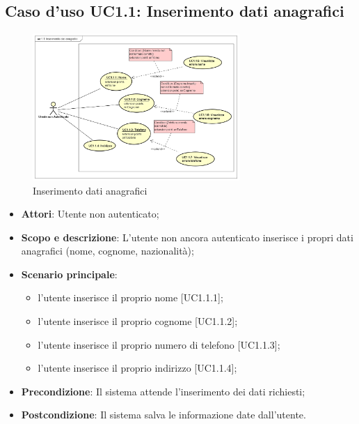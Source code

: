 \documentclass[12pt,a4paper,titlepage]{article}
\begin{document}
	\subsection{Caso d'uso UC1.1: Inserimento dati anagrafici}
	\label{UC1.1}
	\begin{figure}[ht]
		\centering
		\includegraphics[width=0.7\textwidth]{UseCase/InserimentoDatiAnagrafici}
		\caption{Inserimento dati anagrafici}
	\end{figure}
	\begin{itemize}
		\item \textbf{Attori}: Utente non autenticato;
		\item \textbf{Scopo e descrizione}: L'utente non ancora autenticato inserisce i propri dati anagrafici (nome, cognome, nazionalità);
		\item \textbf{Scenario principale}: 
		\begin{itemize}
			\item l'utente inserisce il proprio nome [UC1.1.1];
			\item l'utente inserisce il proprio cognome [UC1.1.2];
			\item l'utente inserisce il proprio numero di telefono [UC1.1.3];
			\item l'utente inserisce il proprio indirizzo [UC1.1.4];
		\end{itemize}
		\item \textbf{Precondizione}: Il sistema attende l'inserimento dei dati richiesti;
		\item \textbf{Postcondizione}: Il sistema salva le informazione date dall'utente.
	\end{itemize}
\end{document}
